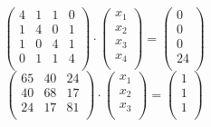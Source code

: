 \documentclass{report}
\begin{document}
        \begin{equation}
        \begin{pmatrix}
          4 & 1 & 1 & 0 \\
          1 & 4 & 0 & 1 \\
          1 & 0 & 4 & 1 \\
          0 & 1 & 1 & 4 \\
        \end{pmatrix}
        \cdot
        \begin{pmatrix}
          x_1 \\
          x_2 \\
          x_3 \\
          x_4 \\
        \end{pmatrix}
        =
        \begin{pmatrix}
          0 \\
          0 \\
          0 \\
          24 \\
        \end{pmatrix}
        \label{syst8}
        \end{equation}
        \begin{equation}
        \begin{pmatrix}
          65 & 40 & 24 \\
          40 & 68 & 17 \\
          24 & 17 & 81 \\
        \end{pmatrix}
        \cdot
        \begin{pmatrix}
          x_1 \\
          x_2 \\
          x_3 \\
        \end{pmatrix}
        =
        \begin{pmatrix}
          1 \\
          1 \\
          1 \\
        \end{pmatrix}
        \label{syst9}
        \end{equation}
\end{document}
